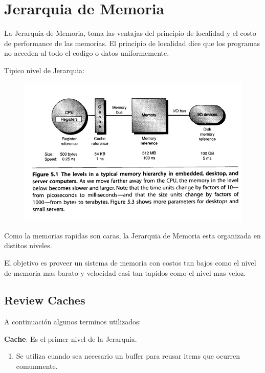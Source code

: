\documentclass{article}
\begin{document}
\newpage{}
\tableofcontents
\newpage{}

\newpage
\section{Jerarquia de Memoria}

La Jerarquia de Memoria, toma las ventajas del principio de localidad y el costo de performance de las memorias.
El principio de localidad dice que los programas no acceden al todo el codigo o datos uniformemente.

Tipico nivel de Jerarquia:

    \begin{figure}[h!]
        \includegraphics[width=\linewidth]{imagenes/Jeraquia_Memoria.png}
    \end{figure}
      

Como la memorias rapidas son caras, la Jerarquia de Memoria esta organizada en distitos niveles.

El objetivo es proveer un sistema de memoria con costos tan bajos como el nivel de memoria mas barato y
velocidad casi tan tapidos como el nivel mas veloz.

\subsection{Review Caches}
A continuación algunos terminos utilizados:

\textbf{Cache}: Es el primer nivel de la Jerarquia. 
\begin{enumerate}
\item Se utiliza cuando sea necesario un buffer para reusar items que ocurren comunmente.
\end{enumerate}
\end{document}
